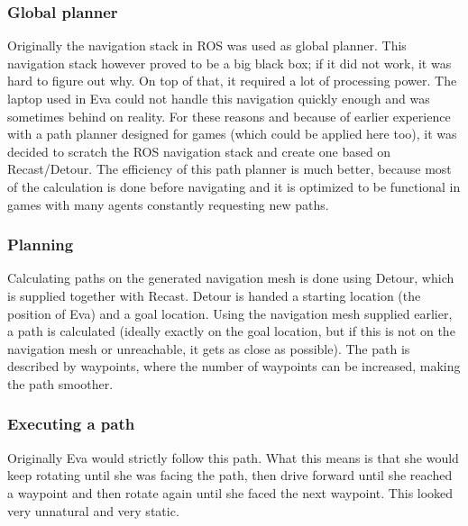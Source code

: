 \documentclass[project_eva.tex]{subfiles}
\begin{document}
\subsubsection*{Global planner}
Originally the navigation stack in ROS was used as global planner. This navigation stack however proved to be a big black box; if it did not work, it was hard to figure out why. On top of that, it required a lot of processing power. The laptop used in Eva could not handle this navigation quickly enough and was sometimes behind on reality. For these reasons and because of earlier experience with a path planner designed for games (which could be applied here too), it was decided to scratch the ROS navigation stack and create one based on Recast/Detour. The efficiency of this path planner is much better, because most of the calculation is done before navigating and it is optimized to be functional in games with many agents constantly requesting new paths.

\subsubsection*{Planning}
Calculating paths on the generated navigation mesh is done using Detour, which is supplied together with Recast. Detour is handed a starting location (the position of Eva) and a goal location. Using the navigation mesh supplied earlier, a path is calculated (ideally exactly on the goal location, but if this is not on the navigation mesh or unreachable, it gets as close as possible). The path is described by waypoints, where the number of waypoints can be increased, making the path smoother.

\subsubsection*{Executing a path}
Originally Eva would strictly follow this path. What this means is that she would keep rotating until she was facing the 
path, then drive forward until she reached a waypoint and then rotate again until she faced the next waypoint. This looked very unnatural and very static. 
\end{document}

